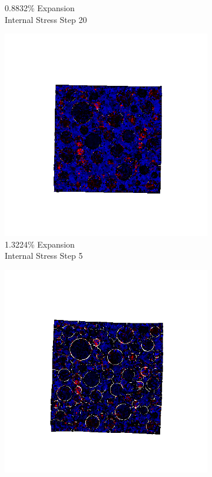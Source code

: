 \begin{figure}[ht!]
\begin{subfigure}{.25\textwidth}
      \caption{0.8832\% Expansion\\Internal Stress Step 20}
    \end{subfigure}
    
    \begin{subfigure}{.25\textwidth}
      \centering
      \includegraphics[width=1.0\linewidth]{Files/exp_3D/ASR/A30P75_5_s5.png}
      \caption{1.3224\% Expansion\\Internal Stress Step 5}
    \end{subfigure}%
    \begin{subfigure}{.25\textwidth}
      \centering
      \includegraphics[width=1.0\linewidth]{Files/exp_3D/ASR/A30P75_5_s10.png}

\end{subfigure}
\end{figure}
